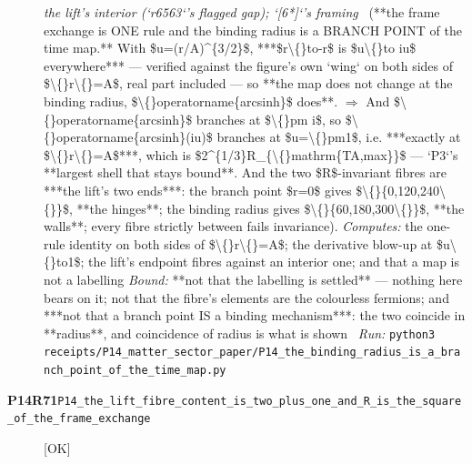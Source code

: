 \begin{description}
\textit{the lift's interior (`r6563`'s flagged gap); `[6*]`'s framing} \ (**the frame exchange is ONE rule and the binding radius is a BRANCH POINT of the time map.** With \$u=(r/A)\textasciicircum{}\{3/2\}\$, ***\$r\textbackslash\{\}to-r\$ is \$u\textbackslash\{\}to iu\$ everywhere*** --- verified against the figure's own `wing` on both sides of \$\textbackslash\{\}\textbar{}r\textbackslash\{\}\textbar{}=A\$, real part included --- so **the map does not change at the binding radius, \$\textbackslash\{\}operatorname\{arcsinh\}\$ does**. \ensuremath{\Rightarrow} And \$\textbackslash\{\}operatorname\{arcsinh\}\$ branches at \$\textbackslash\{\}pm i\$, so \$\textbackslash\{\}operatorname\{arcsinh\}(iu)\$ branches at \$u=\textbackslash\{\}pm1\$, i.e. ***exactly at \$\textbackslash\{\}\textbar{}r\textbackslash\{\}\textbar{}=A\$***, which is \$2\textasciicircum{}\{1/3\}R\_\{\textbackslash\{\}mathrm\{TA,max\}\}\$ --- `P3`'s **largest shell that stays bound**.  And the two \$R\$-invariant fibres are ***the lift's two ends***: the branch point \$r=0\$ gives \$\textbackslash\{\}\{0,120,240\textbackslash\{\}\}\$, **the hinges**; the binding radius gives \$\textbackslash\{\}\{60,180,300\textbackslash\{\}\}\$, **the walls**; every fibre strictly between fails invariance). 
\emph{Computes:} the one-rule identity on both sides of \$\textbackslash\{\}\textbar{}r\textbackslash\{\}\textbar{}=A\$; the derivative blow-up at \$u\textbackslash\{\}to1\$; the lift's endpoint fibres against an interior one; and that a map is not a labelling
 \emph{Bound:}  **not that the labelling is settled** --- nothing here bears on it; not that the fibre's elements are the colourless fermions; and ***not that a branch point IS a binding mechanism***: the two coincide in **radius**, and coincidence of radius is what is shown
\ \emph{Run:} \texttt{python3 receipts/P14\_matter\_sector\_paper/P14\_the\_binding\_radius\_is\_a\_branch\_point\_of\_the\_time\_map.py}
\item[\rcptlabel{P14_the_lift_fibre_content_is_two_plus_one_and_R_is_the_square_of_the_frame_exchange}{P14R71}\textbf{P14R71}\quad\texttt{P14\_the\_lift\_fibre\_content\_is\_two\_plus\_one\_and\_R\_is\_the\_square\_of\_the\_frame\_exchange}]\hfill\textsf{[OK]}\\

\end{description}

